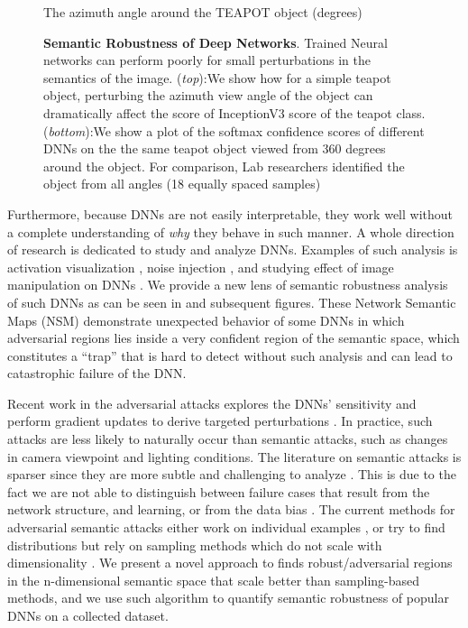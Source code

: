 \begin{figure}[t]
       \small \small \tab The azimuth angle around the TEAPOT object (degrees)
       \vspace{-9pt}
   \caption{\small \textbf{Semantic Robustness of Deep Networks}. Trained Neural networks can perform poorly for small perturbations in the semantics of the image. (\textit{top}):We show how for a simple teapot object, perturbing the azimuth view angle of the object can dramatically affect the score of InceptionV3 \cite{inception} score of the teapot class. (\textit{bottom}):We show a plot of the softmax confidence scores of different DNNs on the the same teapot object viewed from 360 degrees around the object. For comparison, Lab researchers identified the object from all angles (18 equally spaced samples)}
   \vspace{-8pt}
   \label{fig:intro_fig}
\end{figure}

Furthermore, because DNNs are not easily interpretable, they work well without a complete understanding of \textit{why} they behave in such manner. A whole direction of research is dedicated to study and analyze DNNs. Examples of such analysis is activation visualization \cite{unn-visual1,unn-visual3,unn-visual2}, noise injection \cite{unn-robustness-noise1,unn-universal,unn-modar}, and studying effect of image manipulation on DNNs \cite{unn-texture,unn-texture,unn-robustness-geometry}. We provide a new lens of semantic robustness analysis of such DNNs as can be seen in \figLabel{\ref{fig:intro_fig}} and subsequent figures. These Network Semantic Maps (NSM) demonstrate unexpected behavior of some DNNs in which adversarial regions lies inside a very confident region of the semantic space, which constitutes a ``trap'' that is hard to detect without such analysis and can lead to catastrophic failure of the DNN.

Recent work in the adversarial attacks explores the DNNs' sensitivity and perform gradient updates to derive targeted perturbations \cite{first-attack,fast-sign,carlini,projected-gradient}. In practice, such attacks are less likely to naturally occur than semantic attacks, such as changes in camera viewpoint and lighting conditions. The literature on semantic attacks is sparser since they are more subtle and challenging to analyze \cite{normal-light-attack,sada}. This is due to the fact we are not able to distinguish between failure cases that result from the network structure, and learning, or from the data bias \cite{bias}. The current methods for adversarial semantic attacks either work on individual examples \cite{strike}, or try to find distributions but rely on sampling methods which do not scale with dimensionality \cite{sada}. We present a novel approach to finds robust/adversarial regions in the n-dimensional semantic space that scale better than sampling-based methods\cite{sada}, and we use such algorithm to quantify semantic robustness of popular DNNs on a collected dataset.


